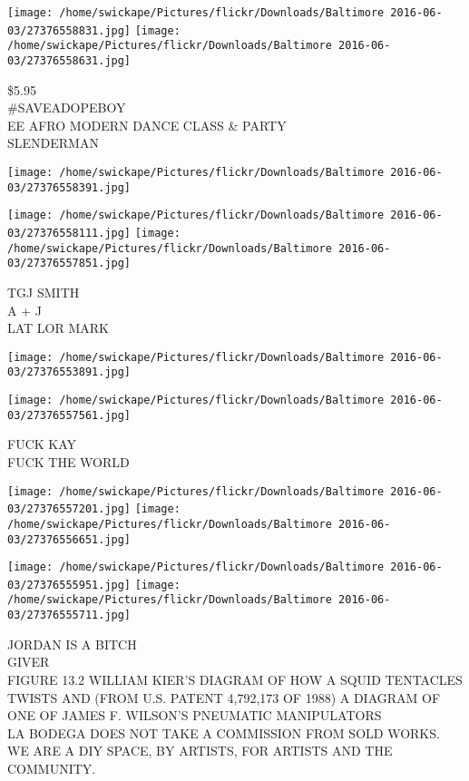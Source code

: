 \documentclass[10pt,letterpaper]{article}
\begin{document}
\texttt{[image: /home/swickape/Pictures/flickr/Downloads/Baltimore 2016-06-03/27376558831.jpg]}
\texttt{[image: /home/swickape/Pictures/flickr/Downloads/Baltimore 2016-06-03/27376558631.jpg]}

\$5.95\\
\#SAVEADOPEBOY\\
EE AFRO MODERN DANCE CLASS \& PARTY\\
SLENDERMAN\\
\pagebreak

\texttt{[image: /home/swickape/Pictures/flickr/Downloads/Baltimore 2016-06-03/27376558391.jpg]}

\vspace{0.25in}
\texttt{[image: /home/swickape/Pictures/flickr/Downloads/Baltimore 2016-06-03/27376558111.jpg]}
\texttt{[image: /home/swickape/Pictures/flickr/Downloads/Baltimore 2016-06-03/27376557851.jpg]}

TGJ SMITH\\
A + J\\
LAT LOR MARK\\
\pagebreak

\texttt{[image: /home/swickape/Pictures/flickr/Downloads/Baltimore 2016-06-03/27376553891.jpg]}

\vspace{0.25in}
\texttt{[image: /home/swickape/Pictures/flickr/Downloads/Baltimore 2016-06-03/27376557561.jpg]}

FUCK KAY\\
FUCK THE WORLD\\
\pagebreak

\texttt{[image: /home/swickape/Pictures/flickr/Downloads/Baltimore 2016-06-03/27376557201.jpg]}
\texttt{[image: /home/swickape/Pictures/flickr/Downloads/Baltimore 2016-06-03/27376556651.jpg]}

\texttt{[image: /home/swickape/Pictures/flickr/Downloads/Baltimore 2016-06-03/27376555951.jpg]}
\texttt{[image: /home/swickape/Pictures/flickr/Downloads/Baltimore 2016-06-03/27376555711.jpg]}

JORDAN IS A BITCH\\
GIVER\\
FIGURE 13.2 WILLIAM KIER'S DIAGRAM OF HOW A SQUID TENTACLES TWISTS AND (FROM U.S. PATENT 4,792,173 OF 1988) A DIAGRAM OF ONE OF JAMES F. WILSON'S PNEUMATIC MANIPULATORS\\
LA BODEGA DOES NOT TAKE A COMMISSION FROM SOLD WORKS.  WE ARE A DIY SPACE, BY ARTISTS, FOR ARTISTS AND THE COMMUNITY.\\
\pagebreak
\end{document}
